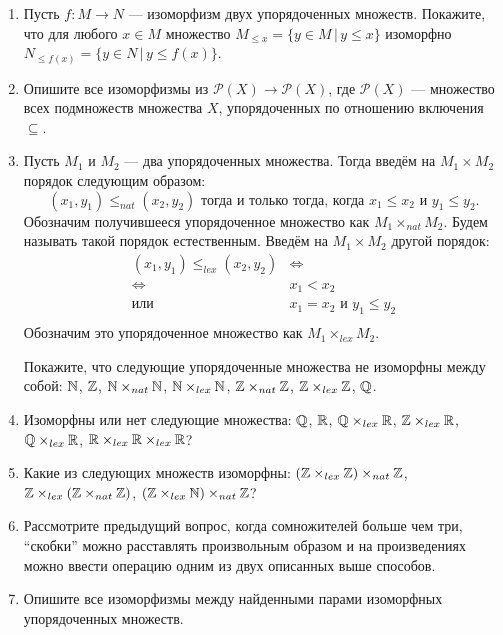 \begin{enumerate}
\item Пусть $f\colon M \to N$ --- изоморфизм двух упорядоченных множеств. Покажите, что для любого $x\in M$ множество $M_{\leq x}=\{y\in M\,|\, y\leq x\}$  изоморфно  $N_{\leq f(x)}=\{y\in N\,|\, y\leq f(x)\}$. 
\item Опишите все изоморфизмы из $\mathcal P(X) \to \mathcal P(X)$, где $\mathcal P(X)$ --- множество всех подмножеств множества $X$, упорядоченных по отношению включения $\subseteq$.
\item Пусть $M_1$ и $M_2$ --- два упорядоченных множества. Тогда введём на $M_1\times M_2$ порядок следующим образом:
 $$(x_1, y_1)\leq_{nat} (x_2,y_2) \text{ тогда и только тогда, когда } x_1\leq x_2 \text{ и } y_1\leq y_2.$$
Обозначим получившееся упорядоченное множество как $M_1\times_{nat}M_2$. Будем называть такой порядок естественным. Введём на $M_1\times M_2$ другой порядок:
\begin{align*}
(x_1, y_1)\leq_{lex} (x_2,y_2) & \Longleftrightarrow \\
\Longleftrightarrow\ \ & x_1< x_2\\
\text{или}\ \ & x_1=x_2 \text{ и } y_1\leq y_2 \\
\end{align*}
Обозначим это упорядоченное множество как $M_1\times_{lex} M_2$.

Покажите, что следующие упорядоченные множества не изоморфны между собой: $\mathbb{N}$, $\mathbb{Z}$, $\mathbb{N}\times_{nat} \mathbb{N}$, $\mathbb{N}\times_{lex} \mathbb{N}$, $\mathbb{Z}\times_{nat} \mathbb{Z}$, $\mathbb{Z}\times_{lex} \mathbb{Z}$, $\mathbb{Q}$.
\item Изоморфны или нет следующие множества: $\mathbb{Q}$, $\mathbb{R}$, $\mathbb{Q} \times_{lex} \mathbb{R}$, $\mathbb{Z} \times_{lex} \mathbb{R}$, $\mathbb{Q} \times_{lex} \mathbb{R}$, $\mathbb{R} \times_{lex} \mathbb{R} \times_{lex} \mathbb{R}$?
\item Какие из следующих множеств изоморфны: $(\mathbb{Z}\times_{lex} \mathbb{Z})\times_{nat} \mathbb{Z}$, $\mathbb{Z}\times_{lex} (\mathbb{Z}\times_{nat} \mathbb{Z})$, $(\mathbb{Z}\times_{lex} \mathbb{N})\times_{nat} \mathbb{Z}$?
\item Рассмотрите предыдущий вопрос, когда сомножителей больше чем три, ``скобки''  можно расставлять произвольным образом и на произведениях можно ввести операцию одним из двух описанных выше способов.
\item Опишите все изоморфизмы между найденными парами изоморфных упорядоченных множеств.
\end{enumerate}


